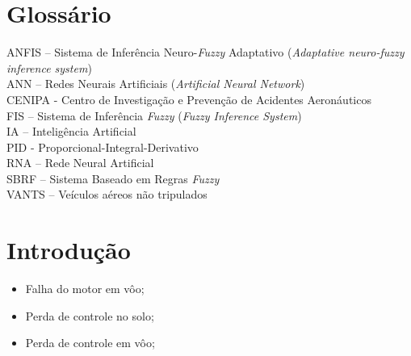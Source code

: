 \documentclass[10pt,a4paper]{article}
\numberwithin{equation}{section}
\begin{document}
\newpage

\section*{Glossário}

\noindent ANFIS – Sistema de Inferência Neuro-\textit{Fuzzy} Adaptativo (\textit{Adaptative neuro-fuzzy inference system})\\
ANN – Redes Neurais Artificiais (\textit{Artificial Neural Network})\\
CENIPA - Centro de Investigação e Prevenção de Acidentes Aeronáuticos\\
FIS – Sistema de Inferência \textit{Fuzzy} (\textit{Fuzzy Inference System})\\
IA – Inteligência Artificial\\
PID - Proporcional-Integral-Derivativo\\
RNA – Rede Neural Artificial\\
SBRF – Sistema Baseado em Regras \textit{Fuzzy}\\
VANTS – Veículos aéreos não tripulados\\







\newpage
\tableofcontents
\newpage
{}
\setcounter{page}{12}
\section{Introdução}

\begin{itemize}
\item Falha do motor em vôo;
\item Perda de controle no solo;
\item Perda de controle em vôo;
\end{itemize}
\end{document}
